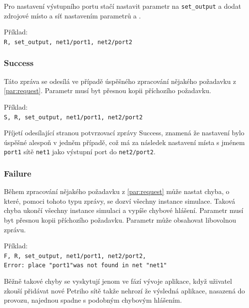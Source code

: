 Pro nastavení výstupního portu stačí nastavit parametr  na \texttt{set\_output} a dodat zdrojové místo a síť nastavením parametrů  a .

\begin{tabbing}
  Příklad: \= \\
  \> \texttt{R, set\_output, net1/port1, net2/port2} \\
\end{tabbing}

\subsubsection{Success} Táto zpráva se odesílá ve případě úspěšného zpracování nějakého požadavku z \ref{par:request}. Parametr  musí byt přesnou kopii příchozího požadavku.

\begin{tabbing}
  Příklad: \= \\
  \> \texttt{S, R, set\_output, net1/port1, net2/port2} \\
\end{tabbing}

Příjetí odesílající stranou potvrzovací zprávy Success, znamená že nastavení bylo úspěšné alespoň v jedněm případě, což má za následek nastavení místa s jménem \texttt{port1} sítě \texttt{net1} jako výstupní port do \texttt{net2/port2}.

\subsubsection{Failure} Během zpracování nějakého požadavku z \ref{par:request} může nastat chyba, o které, pomoci tohoto typu zprávy, se dozví všechny instance simulace. Taková chyba ukončí všechny instance simulaci a vypíše chybové hlášení. Parametr  musí byt přesnou kopii příchozího požadavku. Parametr  může obsahovat libovolnou zprávu.

\begin{tabbing}
  Příklad: \= \\
  \> \texttt{F, R, set\_output, net1/port1, net2/port2, }\\
  \> \texttt{Error: place "port1"\space was not found in net "net1"} \\
\end{tabbing}

Běžně takové chyby se vyskytují jenom ve fází vývoje aplikace, když uživatel zkouší přidávat nové Petriho sítě takže nehrozí že výsledná aplikace, nasazená do provozu, najednou spadne s podobným chybovým hlášením.

